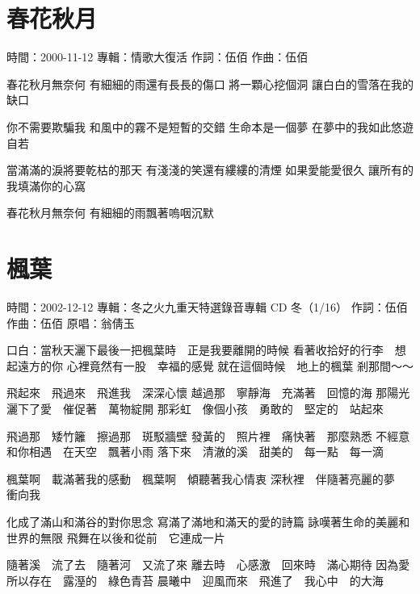 \documentclass[UTF8,a4paper,oneside,twocolumn,12pt]{ctexbook}
\newcommand{\infopair}[2]{\textbullet #1：#2}
\newcommand{\zc}[1][伍佰]{\infopair{作詞}{#1}}
\newcommand{\zq}[1][伍佰]{\infopair{作曲}{#1}}
\newcommand{\zj}[1]{\infopair{專輯}{#1}}
\newcommand{\yc}[1]{\infopair{原唱}{#1}}
\newcommand{\sj}[1]{\infopair{時間}{#1}}
\newenvironment{info}{\begin{flushleft}\kaishu
	}
	{\end{flushleft}\normalsize\yahei\par}
\newenvironment{lyric}{
	}
{}
\begin{document}
\section{春花秋月}
\begin{info}
	\sj{2000-11-12}
	\zj{情歌大復活}
	\zc
	\zq
\end{info}
\begin{lyric}
	春花秋月無奈何
	有細細的雨還有長長的傷口
	將一顆心挖個洞
	讓白白的雪落在我的缺口

	你不需要欺騙我
	和風中的霧不是短暫的交錯
	生命本是一個夢
	在夢中的我如此悠遊自若

	當滿滿的淚將要乾枯的那天
	有淺淺的笑還有縷縷的清煙
	如果愛能愛很久
	讓所有的我填滿你的心窩

	春花秋月無奈何
	有細細的雨飄著嗚咽沉默
\end{lyric}

\section{楓葉}
\begin{info}
	\sj{2002-12-12}
	\zj{冬之火九重天特選錄音專輯 CD 冬（1/16）}
	\zc
	\zq
	\yc{翁倩玉}
\end{info}
\begin{lyric}
	口白：當秋天灑下最後一把楓葉時　正是我要離開的時候
	看著收拾好的行李　想起遠方的你
	心裡竟然有一股　幸福的感覺
	就在這個時候　地上的楓葉
	剎那間～～

	飛起來　飛過來　飛進我　深深心懷
	越過那　寧靜海　充滿著　回憶的海
	那陽光　灑下了愛　催促著　萬物綻開
	那彩虹　像個小孩　勇敢的　堅定的　站起來

	飛過那　矮竹籬　擦過那　斑駁牆壁
	發黃的　照片裡　痛快著　那麼熟悉
	不經意　和你相遇　在天空　飄著小雨
	落下來　清澈的溪　甜美的　每一點　每一滴

	楓葉啊　載滿著我的感動　楓葉啊　傾聽著我心情衷
	深秋裡　伴隨著亮麗的夢　衝向我

	化成了滿山和滿谷的對你思念
	寫滿了滿地和滿天的愛的詩篇
	詠嘆著生命的美麗和世界的無限
	飛舞在以後和從前　它連成一片

	隨著溪　流了去　隨著河　又流了來
	離去時　心感激　回來時　滿心期待
	因為愛　所以存在　露溼的　綠色青苔
	晨曦中　迎風而來　飛進了　我心中　的大海
\end{lyric}
\end{document}
